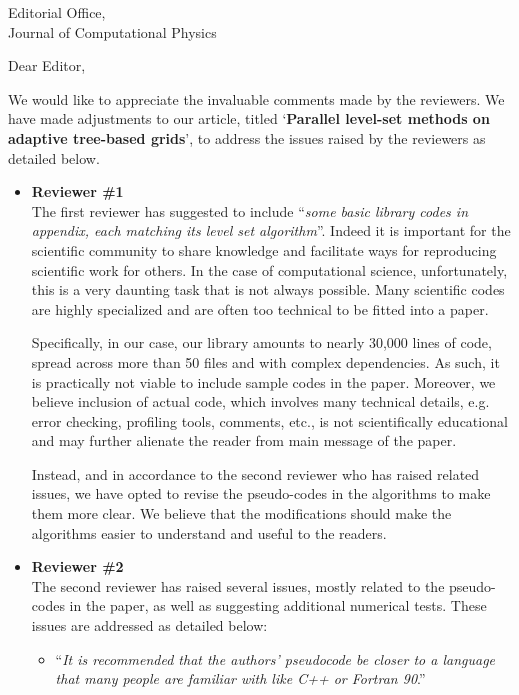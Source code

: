 \documentclass{scrlttr2}
\begin{document}
\begin{letter} {Editorial Office, \\ Journal of Computational Physics}
\opening{Dear Editor,}
We would like to appreciate the invaluable comments made by the reviewers. We have made adjustments to our article, titled `\textbf{Parallel level-set methods on adaptive tree-based grids}', to address the issues raised by the reviewers as detailed below. 

\begin{itemize}
\item \textbf{Reviewer \#1} \\
The first reviewer has suggested to include ``\textit{some basic library codes in appendix, each matching its level set algorithm}''. Indeed it is important for the scientific community to share knowledge and facilitate ways for reproducing scientific work for others. In the case of computational science, unfortunately, this is a very daunting task that is not always possible. Many scientific codes are highly specialized and are often too technical to be fitted into a paper. 

Specifically, in our case, our library amounts to nearly 30,000 lines of code, spread across more than 50 files and with complex dependencies. As such, it is practically not viable to include sample codes in the paper. Moreover, we believe inclusion of actual code, which involves many technical details, e.g. error checking, profiling tools, comments, etc., is not scientifically educational and may further alienate the reader from main message of the paper.

Instead, and in accordance to the second reviewer who has raised related issues, we have opted to revise the pseudo-codes in the algorithms to make them more clear. We believe that the modifications should make the algorithms easier to understand and useful to the readers.

\item \textbf{Reviewer \#2} \\
The second reviewer has raised several issues, mostly related to the pseudo-codes in the paper, as well as suggesting additional numerical tests. These issues are addressed as detailed below:
\begin{itemize}
\item ``\textit{It is recommended that the authors' pseudocode be closer to a language that many people are familiar with like C++ or Fortran 90}.''


\end{itemize}
\end{itemize}
\end{letter}
\end{document}

